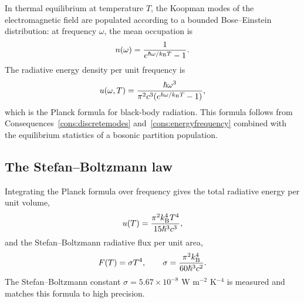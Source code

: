 In thermal equilibrium at temperature $T$, the Koopman modes of the electromagnetic field are populated according to a bounded Bose--Einstein distribution: at frequency $\omega$, the mean occupation is
\begin{equation*}
n(\omega)=\frac{1}{e^{\hslash\omega/k_{\mathrm{B}} T}-1}.
\end{equation*}
The radiative energy density per unit frequency is
\begin{equation*}
u(\omega,T)=\frac{\hslash\omega^{3}}{\pi^{2}c^{3}(e^{\hslash\omega/k_{\mathrm{B}} T}-1)},
\end{equation*}
which is the Planck formula for black-body radiation. This formula follows from Consequences~\ref{cons:discretemodes} and~\ref{cons:energyfrequency} combined with the equilibrium statistics of a bosonic partition population.

\subsection{The Stefan--Boltzmann law}

Integrating the Planck formula over frequency gives the total radiative energy per unit volume,
\begin{equation*}
u(T)=\frac{\pi^{2}k_{\mathrm{B}}^{4}T^{4}}{15\hslash^{3}c^{3}},
\end{equation*}
and the Stefan--Boltzmann radiative flux per unit area,
\begin{equation*}
F(T)=\sigma T^{4},\qquad \sigma=\frac{\pi^{2}k_{\mathrm{B}}^{4}}{60\hslash^{3}c^{2}}.
\end{equation*}
The Stefan--Boltzmann constant $\sigma=5.67\times 10^{-8}$ W m$^{-2}$ K$^{-4}$ is measured and matches this formula to high precision.
